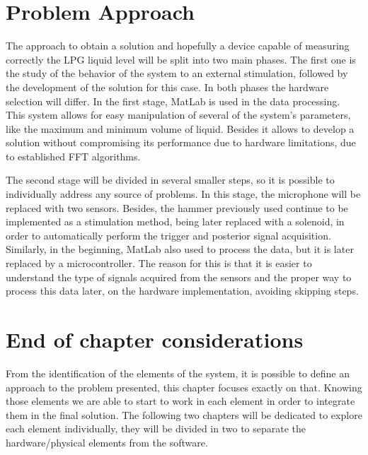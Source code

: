 \section{Problem Approach}
The approach to obtain a solution and hopefully a device capable of measuring correctly the LPG liquid level will be split into two main phases. The first one is the study of the behavior of the system to an external stimulation, followed by the development of the solution for this case. In both phases the hardware selection will differ. In the first stage, MatLab is used in the data processing. This
system allows for easy manipulation of several of the system’s parameters, like the maximum and minimum volume of liquid. Besides it allows to develop a solution without compromising its performance due to hardware limitations, due to established FFT algorithms.

The second stage will be divided in several smaller steps, so it is possible to individually address any source of problems. In this stage, the microphone will be replaced with two sensors. Besides, the hammer previously used continue to be implemented as a stimulation method, being later replaced with a solenoid, in order to automatically perform the trigger and posterior signal acquisition. Similarly, in the beginning, MatLab also used to process the data, but it is later replaced by a microcontroller. The reason for this is that it is easier to understand
the type of signals acquired from the sensors and the proper way to process this data later, on the hardware implementation, avoiding skipping steps.
\section{End of chapter considerations}
From the identification of the elements of the system, it is possible to define an approach to the problem presented, this chapter focuses exactly on that. Knowing those elements we are able to start to work in each element in order to integrate them in the final solution. The following two chapters will be dedicated to explore each element individually, they will be divided in two to separate the hardware/physical elements from the software.

\clearpage
